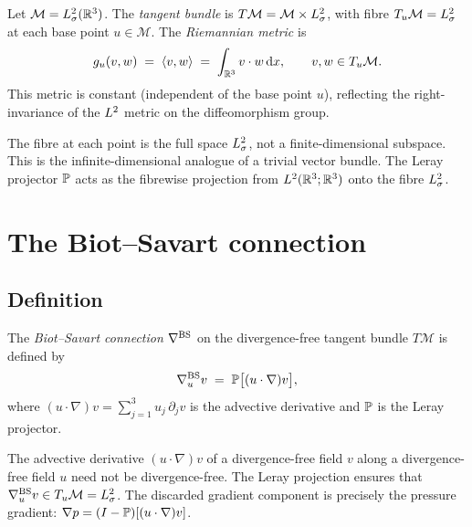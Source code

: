 \begin{definition}\label{def:tangent-bundle}
  Let $\mathcal{M} = L^{2}_\sigma(\mathbb{R}^3)$.  The \emph{tangent bundle} is
  $T\mathcal{M} = \mathcal{M} \times L^{2}_\sigma$, with fibre $T_u\mathcal{M} = L^{2}_\sigma$ at
  each base point $u \in \mathcal{M}$.  The \emph{Riemannian metric} is
  \begin{equation}\label{eq:L2-metric}
    g_u(v, w) \;=\; \left\langle v, w \right\rangle \;=\; \int_{\mathbb{R}^3} v \cdot w\,\mathrm{d} x,
    \qquad v, w \in T_u\mathcal{M}.
  \end{equation}
  This metric is constant (independent of the base point $u$), reflecting the
  right-invariance of the $L^{2}$ metric on the diffeomorphism group.
\end{definition}

\begin{remark}
  The fibre at each point is the full space $L^{2}_\sigma$, not a finite-dimensional subspace.
  This is the infinite-dimensional analogue of a trivial vector bundle.  The Leray
  projector $\mathbb{P}$ acts as the fibrewise projection from $L^{2}(\mathbb{R}^3;\mathbb{R}^3)$ onto
  the fibre $L^{2}_\sigma$.
\end{remark}

\section{The Biot--Savart connection}\label{sec:bs-connection}

\subsection{Definition}

\begin{definition}\label{def:bs-conn}
  The \emph{Biot--Savart connection} $\nabla^{\mathrm{BS}}$ on the divergence-free tangent bundle
  $T\mathcal{M}$ is defined by
  \begin{equation}\label{eq:bs-conn}
    \nabla^{\mathrm{BS}}_u v \;=\; \mathbb{P}\bigl[(u \cdot \nabla) v\bigr],
  \end{equation}
  where $(u \cdot \nabla)v = \sum_{j=1}^{3} u_j\,\partial_j v$ is the advective
  derivative and $\mathbb{P}$ is the Leray projector.
\end{definition}

\begin{remark}
  The advective derivative $(u \cdot \nabla)v$ of a divergence-free field $v$ along a
  divergence-free field $u$ need not be divergence-free.  The Leray projection ensures
  that $\nabla^{\mathrm{BS}}_u v \in T_u\mathcal{M} = L^{2}_\sigma$.  The discarded gradient component is
  precisely the pressure gradient: $\nabla p = (I - \mathbb{P})[(u \cdot \nabla)v]$.
\end{remark}

